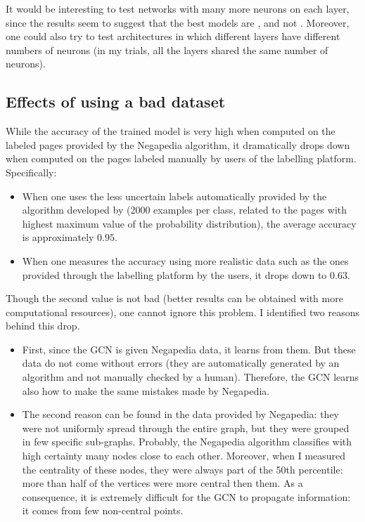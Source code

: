             It would be interesting to test networks with many more neurons on each layer, since the results seem to suggest that the best models are , and not . Moreover, one could also try to test architectures in which different layers have different numbers of neurons (in my trials, all the layers shared the same number of neurons).
        \subsection{Effects of using a bad dataset}
            While the accuracy of the trained model is very high when computed on the labeled pages provided by the Negapedia algorithm, it dramatically drops down when computed on the pages labeled manually by users of the labelling platform. Specifically:
            \begin{itemize}
                \item When one uses the less uncertain labels automatically provided by the algorithm developed by \citeauthor{Bonetti} \cite{Bonetti} (2000 examples per class, related to the pages with highest maximum value of the probability distribution), the average accuracy is approximately \(0.95\).
                \item When one measures the accuracy using more realistic data such as the ones provided through the labelling platform by the users, it drops down to \(0.63\).
            \end{itemize}
            
            Though the second value is not bad (better results can be obtained with more computational resources), one cannot ignore this problem. I identified two reasons behind this drop.
            \begin{itemize}
                \item First, since the GCN is given Negapedia data, it learns from them. But these data do not come without errors (they are automatically generated by an algorithm and not manually checked by a human). Therefore, the GCN learns also how to make the same mistakes made by Negapedia.
                \item The second reason can be found in the data provided by Negapedia: they were not uniformly spread through the entire graph, but they were grouped in few specific sub-graphs. Probably, the Negapedia algorithm classifies with high certainty many nodes close to each other. Moreover, when I measured the centrality of these nodes, they were always part of the 50th percentile: more than half of the vertices were more central then them. As a consequence, it is extremely difficult for the GCN to propagate information: it comes from few non-central points.
            \end{itemize}
            

